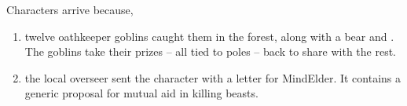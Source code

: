 \begin{multicols}{2}
{  Characters arrive because,

  \begin{enumerate}
    \item
    twelve oathkeeper goblins caught them in the forest, along with a bear and .
    The goblins take their prizes -- all tied to poles -- back to share with the rest.
    \item
    the local overseer sent the character with a letter for \gls{MindElder}.
    It contains a generic proposal for mutual aid in killing beasts.
  \end{enumerate}

}

\end{multicols}

